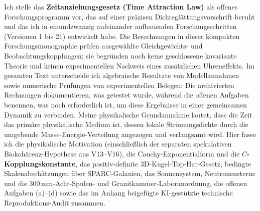 \documentclass[10pt,a4paper]{article}
\begin{document}
{\small{}\par
Ich stelle das \textbf{Zeitanziehungsgesetz (Time Attraction Law)} als offenes Forschungsprogramm vor, das auf einer pr\"azisen Dichtegl\"attungsvorschrift beruht und das ich in einundzwanzig aufeinander aufbauenden Forschungsschritten (Versionen 1 bis 21) entwickelt habe. Die Berechnungen in dieser kompakten Forschungsmonographie pr\"ufen ausgew\"ahlte Gleichgewichts- und Beobachtungskopplungen; sie begr\"unden noch keine geschlossene kovariante Theorie und keinen experimentellen Nachweis eines zus\"atzlichen Uhreneffekts. Im gesamten Text unterscheide ich algebraische Resultate von Modellannahmen sowie numerische Pr\"ufungen von experimentellen Belegen: Die archivierten Rechnungen dokumentieren, was getestet wurde, w\"ahrend die offenen Aufgaben benennen, was noch erforderlich ist, um diese Ergebnisse in einer gemeinsamen Dynamik zu verbinden. Meine physikalische Grundannahme lautet, dass die Zeit das prim\"are physikalische Medium ist, dessen lokale Str\"omungsdichte durch die umgebende Masse-Energie-Verteilung angezogen und verlangsamt wird. Hier fasse ich die physikalische Motivation (einschlie\ss lich der separaten spekulativen Biokoh\"arenz-Hypothese aus V13--V16), die Cauchy-Exponentialform und die \textbf{$C$-Kopplungskonstante}, das positiv-definite 3D-Kugel-Top-Hat-Gesetz, bedingte Skalenabsch\"atzungen \"uber SPARC-Galaxien, das Sonnensystem, Neutronensterne und die $300\,\text{mm}$-Acht-Spulen- und Granitkammer-Laboranordnung, die offenen Aufgaben (a)--(d) sowie das im Anhang beigef\"ugte KI-gest\"utzte technische Reproduktions-Audit zusammen.

}
\end{document}

